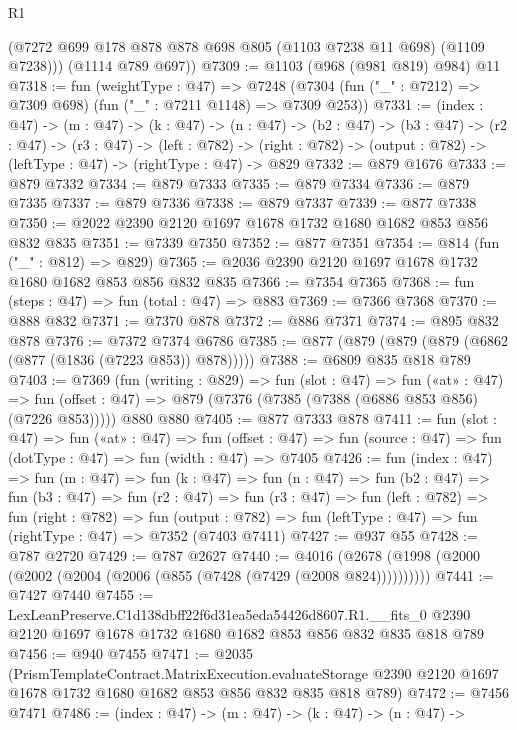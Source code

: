 \begin{lexlean}{R1}
\begin{coremodule}
        (@7272 @699 @178 @878 @878 @698 @805 (@1103 @7238 @11 @698) (@1109 @7238)))
      (@1114 @789 @697))
@7309 := @1103 (@968 (@981 @819) @984) @11
@7318 := fun (weightType : @47) =>
  @7248 (@7304 (fun ("_" : @7212) => @7309 @698) (fun ("_" : @7211 @1148) => @7309 @253))
@7331 := (index : @47) ->
  (m : @47) ->
  (k : @47) ->
  (n : @47) ->
  (b2 : @47) ->
  (b3 : @47) ->
  (r2 : @47) ->
  (r3 : @47) ->
  (left : @782) ->
  (right : @782) -> (output : @782) -> (leftType : @47) -> (rightType : @47) -> @829
@7332 := @879 @1676
@7333 := @879 @7332
@7334 := @879 @7333
@7335 := @879 @7334
@7336 := @879 @7335
@7337 := @879 @7336
@7338 := @879 @7337
@7339 := @877 @7338
@7350 := @2022 @2390 @2120 @1697 @1678 @1732 @1680 @1682 @853 @856 @832 @835
@7351 := @7339 @7350
@7352 := @877 @7351
@7354 := @814 (fun ("_" : @812) => @829)
@7365 := @2036 @2390 @2120 @1697 @1678 @1732 @1680 @1682 @853 @856 @832 @835
@7366 := @7354 @7365
@7368 := fun (steps : @47) => fun (total : @47) => @883
@7369 := @7366 @7368
@7370 := @888 @832
@7371 := @7370 @878
@7372 := @886 @7371
@7374 := @895 @832 @878
@7376 := @7372 @7374 @6786
@7385 := @877 (@879 (@879 (@879 (@6862 (@877 (@1836 (@7223 @853)) @878)))))
@7388 := @6809 @835 @818 @789
@7403 := @7369
    (fun (writing : @829) =>
    fun (slot : @47) =>
    fun («at» : @47) =>
    fun (offset : @47) => @879 (@7376 (@7385 (@7388 (@6886 @853 @856) (@7226 @853)))))
    @880
    @880
@7405 := @877 @7333 @878
@7411 := fun (slot : @47) =>
  fun («at» : @47) =>
  fun (offset : @47) => fun (source : @47) => fun (dotType : @47) => fun (width : @47) => @7405
@7426 := fun (index : @47) =>
  fun (m : @47) =>
  fun (k : @47) =>
  fun (n : @47) =>
  fun (b2 : @47) =>
  fun (b3 : @47) =>
  fun (r2 : @47) =>
  fun (r3 : @47) =>
  fun (left : @782) =>
  fun (right : @782) =>
  fun (output : @782) => fun (leftType : @47) => fun (rightType : @47) => @7352 (@7403 @7411)
@7427 := @937 @55
@7428 := @787 @2720
@7429 := @787 @2627
@7440 := @4016 (@2678 (@1998 (@2000 (@2002 (@2004 (@2006 (@855 (@7428 (@7429 (@2008 @824))))))))))
@7441 := @7427 @7440
@7455 := LexLeanPreserve.C1d138dbff22f6d31ea5eda54426d8607.R1.__fits_0
    @2390
    @2120
    @1697
    @1678
    @1732
    @1680
    @1682
    @853
    @856
    @832
    @835
    @818
    @789
@7456 := @940 @7455
@7471 := @2035
    (PrismTemplateContract.MatrixExecution.evaluateStorage
      @2390
      @2120
      @1697
      @1678
      @1732
      @1680
      @1682
      @853
      @856
      @832
      @835
      @818
      @789)
@7472 := @7456 @7471
@7486 := (index : @47) ->
  (m : @47) ->
  (k : @47) ->
  (n : @47) ->

\end{coremodule}
\end{lexlean}
